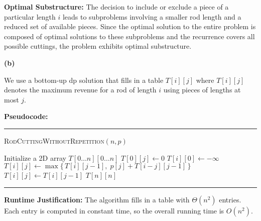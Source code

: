 \documentclass[11pt]{article}
\begin{document}
        \textbf{Optimal Substructure:}  
        The decision to include or exclude a piece of a particular length \(i\) leads to subproblems involving a smaller rod length and a reduced set of available pieces. Since the optimal solution to the entire problem is composed of optimal solutions to these subproblems and the recurrence covers all possible cuttings, the problem exhibits optimal substructure.
        
        \vspace{1em}
        
        \textbf{(b)}
        
        We use a bottom-up dp solution that fills in a table \(T[i][j]\) where \(T[i][j]\) denotes the maximum revenue for a rod of length \(i\) using pieces of lengths at most \(j\).

        \bigskip
        
        \textbf{Pseudocode:}

        \par\noindent\rule{\textwidth}{0.4pt}
        \smallskip        
        \textsc{RodCuttingWithoutRepetition}$(n, p)$
        \begin{algorithmic}[1]
            \STATE Initialize a 2D array $T[0 \ldots n][0 \ldots n]$
                \STATE $T[0][j] \gets 0$
            \ENDFOR
                \STATE $T[i][0] \gets -\infty$
            \ENDFOR
                        \STATE $T[i][j] \gets \max\{\,T[i][j-1],\; p[j] + T[i-j][j-1]\,\}$
                    \ELSE
                        \STATE $T[i][j] \gets T[i][j-1]$
                    \ENDIF
                \ENDFOR
            \ENDFOR
            \RETURN $T[n][n]$
        \end{algorithmic}
        \smallskip
        \par\noindent\rule{\textwidth}{0.4pt}
        
        \textbf{Runtime Justification:}  
        The algorithm fills in a table with \(\Theta(n^2)\) entries. Each entry is computed in constant time, so the overall running time is \(O(n^2)\).

    \newpage
\end{document}
